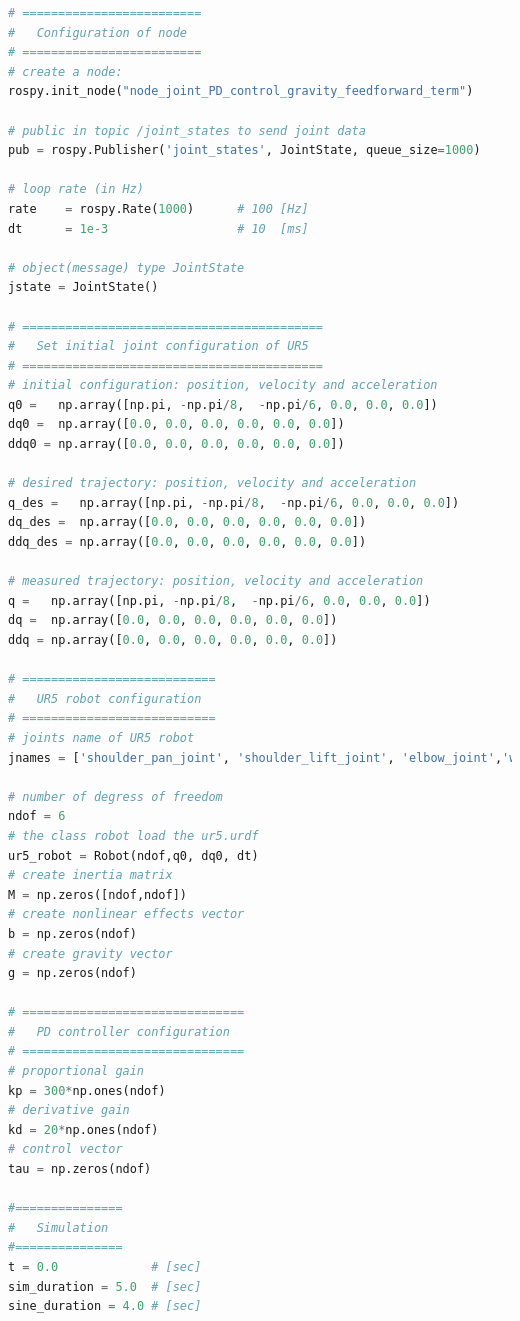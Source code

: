 \begin{lstlisting}[language=Python,caption={Move the second and fifth joint of UR5 robot with the requirement motion of activity 1.7.1}, label={lst:joint_PD_gravity_feedforward_sin}]
# =========================
#   Configuration of node
# =========================
# create a node: 
rospy.init_node("node_joint_PD_control_gravity_feedforward_term")

# public in topic /joint_states	to send joint data	
pub = rospy.Publisher('joint_states', JointState, queue_size=1000)

# loop rate (in Hz)
rate 	= rospy.Rate(1000)		# 100 [Hz]
dt 		= 1e-3					# 10  [ms]

# object(message) type JointState
jstate = JointState()

# ==========================================
#   Set initial joint configuration of UR5
# ==========================================
# initial configuration: position, velocity and acceleration 
q0 =   np.array([np.pi, -np.pi/8,  -np.pi/6, 0.0, 0.0, 0.0])
dq0 =  np.array([0.0, 0.0, 0.0, 0.0, 0.0, 0.0]) 
ddq0 = np.array([0.0, 0.0, 0.0, 0.0, 0.0, 0.0]) 

# desired trajectory: position, velocity and acceleration
q_des =   np.array([np.pi, -np.pi/8,  -np.pi/6, 0.0, 0.0, 0.0]) 
dq_des =  np.array([0.0, 0.0, 0.0, 0.0, 0.0, 0.0]) 
ddq_des = np.array([0.0, 0.0, 0.0, 0.0, 0.0, 0.0]) 

# measured trajectory: position, velocity and acceleration
q =   np.array([np.pi, -np.pi/8,  -np.pi/6, 0.0, 0.0, 0.0])
dq =  np.array([0.0, 0.0, 0.0, 0.0, 0.0, 0.0]) 
ddq = np.array([0.0, 0.0, 0.0, 0.0, 0.0, 0.0]) 

# ===========================
#   UR5 robot configuration
# ===========================
# joints name of UR5 robot
jnames = ['shoulder_pan_joint', 'shoulder_lift_joint', 'elbow_joint','wrist_1_joint', 'wrist_2_joint', 'wrist_3_joint']

# number of degress of freedom
ndof = 6
# the class robot load the ur5.urdf
ur5_robot = Robot(ndof,q0, dq0, dt)
# create inertia matrix 
M = np.zeros([ndof,ndof])
# create nonlinear effects vector
b = np.zeros(ndof)
# create gravity vector
g = np.zeros(ndof)

# ===============================
#   PD controller configuration
# ===============================
# proportional gain
kp = 300*np.ones(ndof)
# derivative gain
kd = 20*np.ones(ndof)
# control vector
tau = np.zeros(ndof)    

#===============
#   Simulation
#===============
t = 0.0             # [sec] 
sim_duration = 5.0  # [sec]
sine_duration = 4.0 # [sec]


\end{lstlisting}
